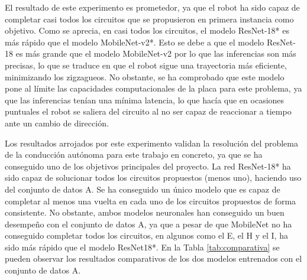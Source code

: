 El resultado de este experimento es prometedor, ya que el robot ha sido capaz de completar casi todos los circuitos que se propusieron en primera instancia como objetivo. Como se aprecia, en casi todos los circuitos, el modelo ResNet-18* es más rápido que el modelo MobileNet-v2*. Esto se debe a que el modelo ResNet-18 es más grande que el modelo MobileNet-v2 por lo que las inferencias son más precisas, lo que se traduce en que el robot sigue una trayectoria más eficiente, minimizando los zigzagueos. No obstante, se ha comprobado que este modelo pone al límite las capacidades computacionales de la placa para este problema, ya que las inferencias tenían una mínima latencia, lo que hacía que en ocasiones puntuales el robot se saliera del circuito al no ser capaz de reaccionar a tiempo ante un cambio de dirección.

Los resultados arrojados por este experimento validan la resolución del problema de la conducción autónoma para este trabajo en concreto, ya que se ha conseguido uno de los objetivos principales del proyecto. La red ResNet-18* ha sido capaz de solucionar todos los circuitos propuestos (menos uno), haciendo uso del conjunto de datos A. Se ha conseguido un único modelo que es capaz de completar al menos una vuelta en cada uno de los circuitos propuestos de forma consistente. No obstante, ambos modelos neuronales han conseguido un buen desempeño con el conjunto de datos A, ya que a pesar de que MobileNet no ha conseguido completar todos los circuitos, en algunos como el E, el H y el I, ha sido más rápido que el modelo ResNet18*. En la Tabla \ref{tab:comparativa} se pueden observar los resultados comparativos de los dos modelos entrenados con el conjunto de datos A.

